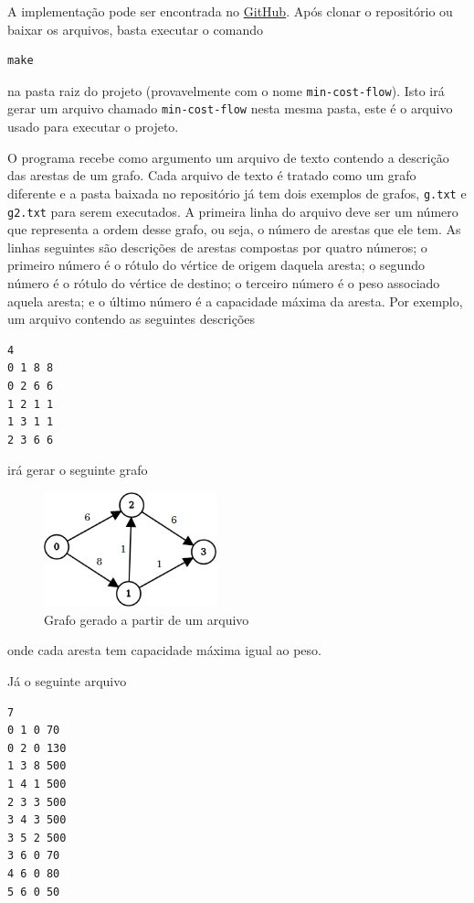 \documentclass[12pt,a4]{article}
\begin{document}
A implementação pode ser encontrada no
\href{https://github.com/MaxWillf/min-cost-flow}{GitHub}. Após clonar o
repositório ou baixar os arquivos, basta executar o comando

\begin{verbatim}
make
\end{verbatim}

\noindent na pasta raiz do projeto (provavelmente com o nome
\texttt{min-cost-flow}). Isto irá gerar um arquivo chamado
\texttt{min-cost-flow} nesta mesma pasta, este é o arquivo usado para executar o
projeto.

O programa recebe como argumento um arquivo de texto contendo a descrição das
arestas de um grafo. Cada arquivo de texto é tratado como um grafo diferente e a
pasta baixada no repositório já tem dois exemplos de grafos, \texttt{g.txt} e
\texttt{g2.txt} para serem executados. A primeira linha do arquivo deve ser um
número que representa a ordem desse grafo, ou seja, o número de arestas que ele
tem. As linhas seguintes são descrições de arestas compostas por quatro números;
o primeiro número é o rótulo do vértice de origem daquela aresta; o segundo
número é o rótulo do vértice de destino; o terceiro número é o peso associado
aquela aresta; e o último número é a capacidade máxima da aresta. Por exemplo,
um arquivo contendo as seguintes descrições

\begin{verbatim}
4
0 1 8 8
0 2 6 6
1 2 1 1
1 3 1 1
2 3 6 6
\end{verbatim}

\noindent irá gerar o seguinte grafo

\begin{figure}[H]
  \centering
  \includegraphics[width=5cm]{alg-graph-example.png}
  \caption{Grafo gerado a partir de um arquivo}
  \label{fig:alg-graph-example}
\end{figure}

\noindent onde cada aresta tem capacidade máxima igual ao peso.

Já o seguinte arquivo

\begin{verbatim}
7
0 1 0 70
0 2 0 130
1 3 8 500
1 4 1 500
2 3 3 500
3 4 3 500
3 5 2 500
3 6 0 70
4 6 0 80
5 6 0 50
\end{verbatim}
\end{document}
